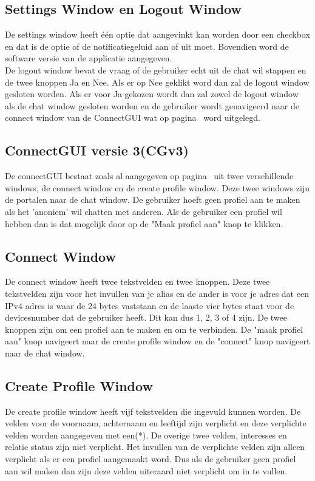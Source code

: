 \documentclass[12pt]{article}
\begin{document}
\subsection*{Settings Window en Logout Window}
\label{LWSW}
De settings window heeft \'e\'en optie dat aangevinkt kan worden door een checkbox en dat is de optie of de notificatiegeluid aan of uit moet. Bovendien word de software versie van de applicatie aangegeven.
\\

\noindent De logout window bevat de vraag of de gebruiker echt uit de chat wil stappen en de twee knoppen Ja en Nee. Als er op Nee geklikt word dan zal de logout window gesloten worden. Als er voor Ja gekozen wordt dan zal zowel de logout window als de chat window gesloten worden en de gebruiker wordt genavigeerd naar de connect window van de ConnectGUI wat op pagina~\pageref{connectie}  word uitgelegd.

\subsection{ConnectGUI versie 3(CGv3)}
\label{ConnectGUI}
De connectGUI bestaat zoals al aangegeven op pagina~\pageref{aangegeven} uit twee verschillende windows, de connect window en de create profile window. Deze twee windows zijn de portalen naar de chat window. De gebruiker hoeft geen profiel aan te maken als het 'anoniem' wil chatten met anderen. Als de gebruiker een profiel wil hebben dan is dat mogelijk door op de "Maak profiel aan" knop te klikken.

\subsection*{Connect Window}
\label{connectie}
De connect window heeft twee tekstvelden en twee knoppen. Deze twee tekstvelden zijn voor het invullen van je alias en de ander is voor je adres dat een IPv4 adres is waar de 24 bytes vaststaan en de laaste vier bytes staat voor de devicesnumber dat de gebruiker heeft. Dit kan dus 1, 2, 3 of 4 zijn. De twee knoppen zijn om een profiel aan te maken en om te verbinden. De "maak profiel aan" knop navigeert naar de create profile window en de "connect" knop navigeert naar de chat window.

\subsection*{Create Profile Window}
\label{CPW}
De create profile window heeft vijf tekstvelden die ingevuld kunnen worden. De velden voor de voornaam, achternaam en leeftijd zijn verplicht en deze verplichte velden worden aangegeven met een(*). De overige twee velden, interesses en relatie status zijn niet verplicht. Het invullen van de verplichte velden zijn alleen verplicht als er een profiel aangemaakt word. Dus als de gebruiker geen profiel aan wil maken dan zijn deze velden uiteraard niet verplicht om in te vullen. 
\newpage
\end{document}
